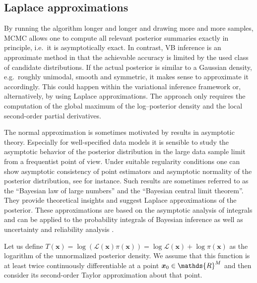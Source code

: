 \subsection{Laplace approximations} \label{sec:Bayesian:BayesianComputations:Laplace}
By running the algorithm longer and longer and drawing more and more samples, MCMC allows one to compute all relevant posterior summaries exactly in principle, i.e.\ it is asymptotically exact.
In contrast, VB inference is an approximate method in that the achievable accuracy is limited by the used class of candidate distributions.
If the actual posterior is similar to a Gaussian density, e.g.\ roughly unimodal, smooth and symmetric, it makes sense to approximate it accordingly.
This could happen within the variational inference framework or, alternatively, by using Laplace approximations.
The approach only requires the computation of the global maximum of the log--posterior density and the local second-order partial derivatives.
\par %
The normal approximation is sometimes motivated by results in asymptotic theory.
Especially for well-specified data models it is sensible to study the asymptotic behavior of the posterior distribution in the large data sample limit from a frequentist point of view.
Under suitable regularity conditions one can show asymptotic consistency of point estimators and asymptotic normality of the posterior distribution,
see \cite{Bayesian:Hartigan1983,Bayesian:Bernardo2000,Bayesian:Ghosh2006} for instance.
Such results are sometimes referred to as the ``Bayesian law of large numbers'' and the ``Bayesian central limit theorem''.
They provide theoretical insights and suggest Laplace approximations of the posterior.
These approximations are based on the asymptotic analysis of integrals \cite{Math:Bleistein1986,Math:Wong1989,Math:Paulsen2014,Math:Temme2015}
and can be applied to the probability integrals of Bayesian inference \cite{Bayesian:Tierney1986,Bayesian:Tierney1989:a,Bayesian:Tierney1989:b}
as well as uncertainty and reliability analysis \cite{Bayesian:Papadimitriou1997,Bayesian:Au1999,Bayesian:Polidori1999}.
\par %
Let us define \(T(\bm{x}) = \log(\mathcal{L}(\bm{x}) \pi(\bm{x})) = \log \mathcal{L}(\bm{x}) + \log \pi(\bm{x})\) as the logarithm of the unnormalized posterior density.
We assume that this function is at least twice continuously differentiable at a point \(\bm{x}_0 \in \mathds{R}^\dimParam\) and then consider its second-order Taylor approximation about that point.
